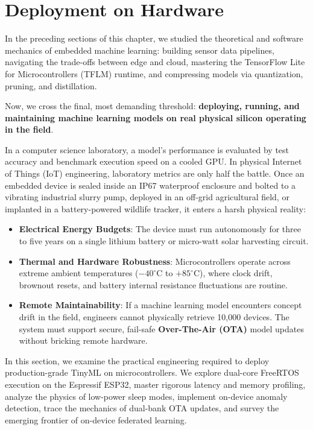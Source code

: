 \section{Deployment on Hardware}\label{sec:hardware_deployment}

In the preceding sections of this chapter, we studied the theoretical and software mechanics of embedded machine learning: building sensor data pipelines, navigating the trade-offs between edge and cloud, mastering the TensorFlow Lite for Microcontrollers (TFLM) runtime, and compressing models via quantization, pruning, and distillation.

Now, we cross the final, most demanding threshold: \textbf{deploying, running, and maintaining machine learning models on real physical silicon operating in the field}.

In a computer science laboratory, a model's performance is evaluated by test accuracy and benchmark execution speed on a cooled GPU. In physical Internet of Things (IoT) engineering, laboratory metrics are only half the battle. Once an embedded device is sealed inside an IP67 waterproof enclosure and bolted to a vibrating industrial slurry pump, deployed in an off-grid agricultural field, or implanted in a battery-powered wildlife tracker, it enters a harsh physical reality:
\begin{itemize}
    \item \textbf{Electrical Energy Budgets}: The device must run autonomously for three to five years on a single lithium battery or micro-watt solar harvesting circuit.
    \item \textbf{Thermal and Hardware Robustness}: Microcontrollers operate across extreme ambient temperatures ($-40^\circ\text{C}$ to $+85^\circ\text{C}$), where clock drift, brownout resets, and battery internal resistance fluctuations are routine.
    \item \textbf{Remote Maintainability}: If a machine learning model encounters concept drift in the field, engineers cannot physically retrieve 10,000 devices. The system must support secure, fail-safe \textbf{Over-The-Air (OTA)} model updates without bricking remote hardware.
\end{itemize}

In this section, we examine the practical engineering required to deploy production-grade TinyML on microcontrollers. We explore dual-core FreeRTOS execution on the Espressif ESP32, master rigorous latency and memory profiling, analyze the physics of low-power sleep modes, implement on-device anomaly detection, trace the mechanics of dual-bank OTA updates, and survey the emerging frontier of on-device federated learning.


